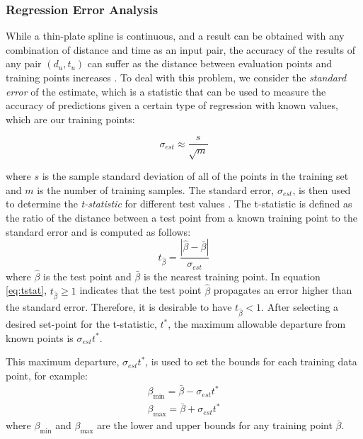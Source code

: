 \documentclass[letterpaper, 10 pt, conference]{ieeeconf}  %
\newcommand\NB[1]{$\spadesuit$\footnote{NB: #1}}
\begin{document}
\subsubsection{Regression Error Analysis} \label{sec:regerror}
While a thin-plate spline is continuous, and a result can be obtained with any combination of distance and time as an input pair, the accuracy of the results of any pair $(d_u,t_u)$ can suffer as the distance between evaluation points and training points increases \cite{regress}. To deal with this problem, we consider the {\em standard error} of the estimate, which is a statistic that can be used to measure the accuracy of predictions given a certain type of regression \cite{stdereg} with known values, which are our training points:

\begin{equation} \label{eq:stderr}
    \sigma_{est} \approx \frac{s}{\sqrt{m}}
\end{equation}

where $s$ is the sample standard deviation of all of the points in the training set and $m$ is the number of training samples. The standard error, $\sigma_{est}$, is then used to determine the {\em t-statistic} for different test values \cite{tstat}. The t-statistic is defined as the ratio of the distance between a test point from a known training point to the standard error and is computed as follows:
\begin{equation} \label{eq:tstat}
t_{\hat{\beta}} = \frac{|\hat{\beta}-\bar{\beta}|}{\sigma_{est}}    
\end{equation}
where $\hat{\beta}$ is the test point and $\bar{\beta}$ is the nearest training point. In equation \eqref{eq:tstat}, $t_{\hat{\beta}} \geq 1$ indicates that the test point $\hat{\beta}$ propagates an error higher than the standard error. Therefore, it is desirable to have $t_{\hat{\beta}} < 1$. 
After selecting a desired set-point for the t-statistic, $t^*$, the maximum allowable departure from known points is $\sigma_{est}t^*$.

This maximum departure, $\sigma_{est}t^*$, is used to set the bounds for each training data point, for example:
\begin{align}
    \beta_{\min} = \bar{\beta} - \sigma_{est}t^* \nonumber \\
    \beta_{\max} = \bar{\beta} + \sigma_{est}t^*
\end{align}
where $\beta_{\min}$ and $\beta_{\max}$ are the lower and upper bounds for any training point $\bar{\beta}$. %
\end{document}
